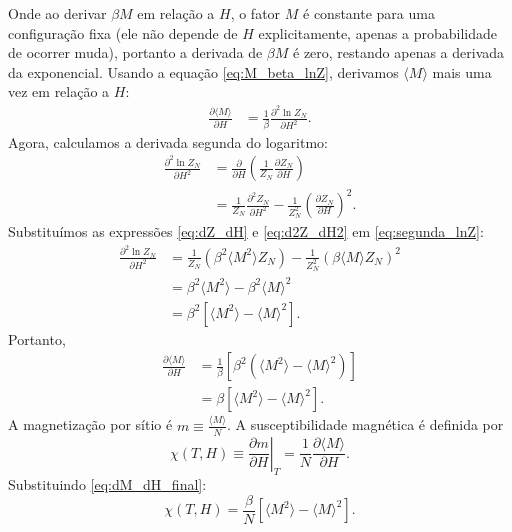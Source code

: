 \documentclass[11pt,a4paper]{article}
\begin{document}
%
Onde ao derivar $\beta M$ em relação a $H$, o fator $M$ é constante para uma configuração fixa (ele não depende de $H$ explicitamente, apenas a probabilidade de ocorrer muda), portanto a derivada de $\beta M$ é zero, restando apenas a derivada da exponencial.
%
Usando a equação \eqref{eq:M_beta_lnZ}, derivamos $\langle M \rangle$ mais uma vez em relação a $H$:
%
\begin{align}
\frac{\partial \langle M \rangle}{\partial H}
&= \frac{1}{\beta} \frac{\partial^2 \ln Z_N}{\partial H^2}.
\end{align}
%
Agora, calculamos a derivada segunda do logaritmo:
%
\begin{align}
\frac{\partial^2 \ln Z_N}{\partial H^2}
&= \frac{\partial}{\partial H} \left( \frac{1}{Z_N} \frac{\partial Z_N}{\partial H} \right) \\
&= \frac{1}{Z_N} \frac{\partial^2 Z_N}{\partial H^2}
- \frac{1}{Z_N^2} \left( \frac{\partial Z_N}{\partial H} \right)^2.
\label{eq:segunda_lnZ}
\end{align}
%
Substituímos as expressões \eqref{eq:dZ_dH} e \eqref{eq:d2Z_dH2} em \eqref{eq:segunda_lnZ}:
%
\begin{align}
\frac{\partial^2 \ln Z_N}{\partial H^2}
&= \frac{1}{Z_N} \left( \beta^2 \langle M^2 \rangle Z_N \right)
- \frac{1}{Z_N^2} \left( \beta \langle M \rangle Z_N \right)^2 \\
&= \beta^2 \langle M^2 \rangle - \beta^2 \langle M \rangle^2 \\
&= \beta^2 \left[ \langle M^2 \rangle - \langle M \rangle^2 \right].
\end{align}
%
Portanto,
%
\begin{align}
\frac{\partial \langle M \rangle}{\partial H}
&= \frac{1}{\beta} \left[ \beta^2 \left( \langle M^2 \rangle - \langle M \rangle^2 \right) \right] \\
&= \beta \left[ \langle M^2 \rangle - \langle M \rangle^2 \right].
\label{eq:dM_dH_final}
\end{align}
%
A magnetização por sítio é $m \equiv \frac{\langle M \rangle}{N}$. A susceptibilidade magnética é definida por
%
\begin{equation}
\chi(T,H) \equiv \left. \frac{\partial m}{\partial H} \right|_T
= \frac{1}{N} \frac{\partial \langle M \rangle}{\partial H}.
\end{equation}
%
Substituindo \eqref{eq:dM_dH_final}:
%
\begin{equation}
\chi(T,H) = \frac{\beta}{N} \left[ \langle M^2 \rangle - \langle M \rangle^2 \right].
\label{eq:chi_variance}
\end{equation}
\end{document}
